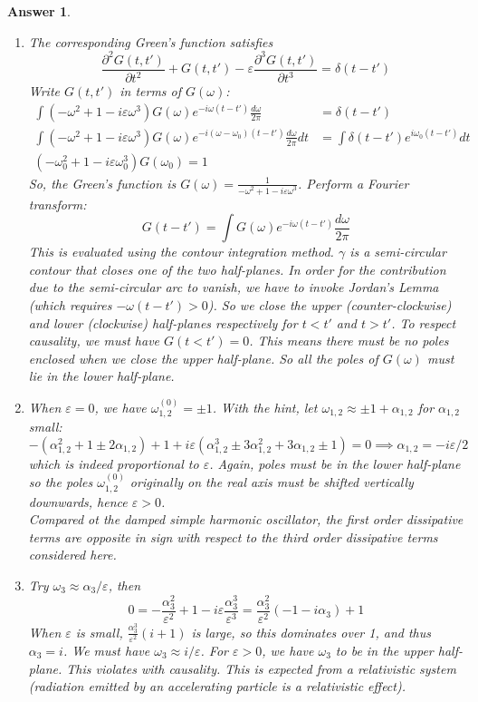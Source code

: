 \documentclass[a4paper]{article}
\newtheorem{ans}{Answer}[section]
\theoremstyle{new}
\begin{document}
\begin{ans}\leavevmode
\begin{enumerate}[label=(\alph*)]
\item The corresponding Green's function satisfies
$$\frac{\partial^2G(t,t')}{\partial t^2}+G(t,t')-\varepsilon\frac{\partial^3G(t,t')}{\partial t^3}=\delta(t-t')$$
Write $G(t,t')$ in terms of $G(\omega)$:
\begin{align}
\int(-\omega^2+1-i\varepsilon\omega^3)G(\omega)e^{-i\omega(t-t')}\frac{d\omega}{2\pi}&=\delta(t-t')\nonumber\\\int(-\omega^2+1-i\varepsilon\omega^3)G(\omega)e^{-i(\omega-\omega_0)(t-t')}\frac{d\omega}{2\pi}dt&=\int\delta(t-t')e^{i\omega_0(t-t')}dt\nonumber\\(-\omega_0^2+1-i\varepsilon\omega_0^3)G(\omega_0)=1\nonumber
\end{align}
So, the Green's function is $G(\omega)=\frac{1}{-\omega^2+1-i\varepsilon\omega^3}$. Perform a Fourier transform:
$$G(t-t')=\int G(\omega)e^{-i\omega(t-t')}\frac{d\omega}{2\pi}$$
This is evaluated using the contour integration method. $\gamma$ is a semi-circular contour that closes one of the two half-planes. In order for the contribution due to the semi-circular arc to vanish, we have to invoke Jordan's Lemma (which requires $-\omega(t-t')>0$). So we close the upper (counter-clockwise) and lower (clockwise) half-planes respectively for $t<t'$ and $t>t'$. To respect causality, we must have $G(t<t')=0$. This means there must be no poles enclosed when we close the upper half-plane. So all the poles of $G(\omega)$ must lie in the lower half-plane.
\item When $\varepsilon=0$, we have $\omega^{(0)}_{1,2}=\pm1$. With the hint, let $\omega_{1,2}\approx \pm1+\alpha_{1,2}$ for $\alpha_{1,2}$ small:
$$-(\alpha_{1,2}^2+1\pm2\alpha_{1,2})+1+i\varepsilon(\alpha_{1,2}^3\pm 3\alpha_{1,2}^2+3\alpha_{1,2}\pm1)=0\implies\alpha_{1,2}=-i\varepsilon/2$$
which is indeed proportional to $\varepsilon$. Again, poles must be in the lower half-plane so the poles $\omega_{1,2}^{(0)}$ originally on the real axis must be shifted vertically downwards, hence $\varepsilon>0$.\\[5pt]
Compared ot the damped simple harmonic oscillator, the first order dissipative terms are opposite in sign with respect to the third order dissipative terms considered here.
\item Try $\omega_3\approx\alpha_3/\varepsilon$, then
$$0=-\frac{\alpha_3^2}{\varepsilon^2}+1-i\varepsilon\frac{\alpha_3^3}{\varepsilon^3}=\frac{\alpha_3^2}{\varepsilon^2}(-1-i\alpha_3)+1$$
When $\varepsilon$ is small, $\frac{\alpha_3^3}{\varepsilon^2}(i+1)$ is large, so this dominates over 1, and thus $\alpha_3=i$. We must have $\omega_3\approx i/\varepsilon$. For $\varepsilon>0$, we have $\omega_3$ to be in the upper half-plane. This violates with causality. This is expected from a relativistic system (radiation emitted by an accelerating particle is a relativistic effect).
\begin{center}
\end{center}
\end{enumerate}
\end{ans}
\end{document}
